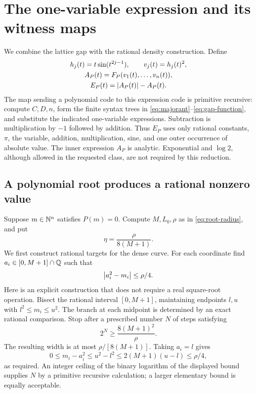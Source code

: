 \section{The one-variable expression and its witness maps}
\label{sec:reduction}

We combine the lattice gap with the rational density construction. Define
\begin{equation}
 \begin{gathered}
 h_j(t)=t\sin(t^{2j-1}),\qquad v_j(t)=h_j(t)^2,\\
 A_P(t)=F_P(v_1(t),\ldots,v_n(t)),\\
 E_P(t)=\left|A_P(t)\right|-A_P(t).
 \end{gathered}\label{eq:compiled-expression}
\end{equation}
The map sending a polynomial code to this expression code is primitive
recursive: compute $C,D,n$, form the finite syntax trees in
\eqref{eq:majorant}--\eqref{eq:gap-function}, and substitute the indicated
one-variable expressions. Subtraction is multiplication by $-1$ followed by
addition. Thus $E_P$ uses only rational constants, $\pi$, the variable,
addition, multiplication, sine, and one outer occurrence of absolute value.
The inner expression $A_P$ is analytic. Exponential and $\log2$, although
allowed in the requested class, are not required by this reduction.

\subsection{A polynomial root produces a rational nonzero value}

Suppose $m\in\mathbb N^n$ satisfies $P(m)=0$. Compute $M,L_0,\rho$ as in
\eqref{eq:root-radius}, and put
\begin{equation}
 \eta=\frac{\rho}{8(M+1)}.\label{eq:square-tolerance}
\end{equation}
We first construct rational targets for the dense curve. For each coordinate
find $a_i\in[0,M+1]\cap\mathbb Q$ such that
\begin{equation}
 \left|a_i^2-m_i\right|\le\rho/4.\label{eq:square-target}
\end{equation}
Here is an explicit construction that does not require a real square-root
operation. Bisect the rational interval $[0,M+1]$, maintaining endpoints
$l,u$ with $l^2\le m_i\le u^2$. The branch at each midpoint is determined
by an exact rational comparison. Stop after a prescribed number $N$ of
steps satisfying
\[
 2^N\ge\frac{8(M+1)^2}{\rho}.
\]
The resulting width is at most $\rho/[8(M+1)]$. Taking $a_i=l$ gives
\[
 0\le m_i-a_i^2\le u^2-l^2
 \le2(M+1)(u-l)\le\rho/4,
\]
as required. An integer ceiling of the binary logarithm of the displayed
bound supplies $N$ by a primitive recursive calculation; a larger elementary
bound is equally acceptable.

